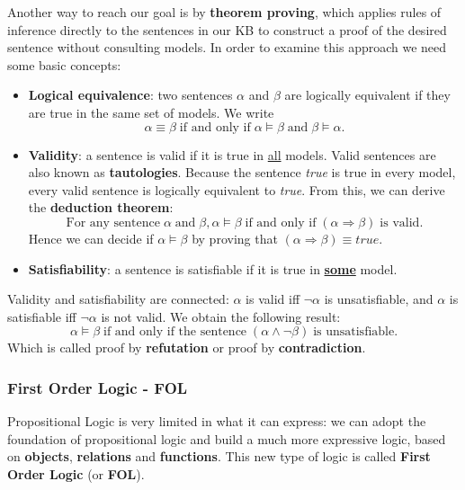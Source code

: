 \documentclass{article}
\begin{document}
Another way to reach our goal is by \textbf{theorem proving}, which applies rules of inference directly to the sentences in our KB to construct a proof of the desired sentence without consulting models. In order to examine this approach we need some basic concepts:
\begin{itemize}
    \item \textbf{Logical equivalence}: two sentences $\alpha$ and $\beta$ are logically equivalent if they are true in the same set of models. We write 
        $$\alpha\equiv\beta \;\text{if and only if}\; \alpha\models\beta \;\text{and}\; \beta\models\alpha.$$
    
    \item \textbf{Validity}: a sentence is valid if it is true in \underline{all} models. Valid sentences are also known as \textbf{tautologies}. Because the sentence \textit{true} is true in every model, every valid sentence is logically equivalent to \textit{true}. From this, we can derive the \textbf{deduction theorem}:
        $$\text{For any sentence}\; \alpha \;\text{and}\; \beta, \alpha\models\beta \;\text{if and only if}\; (\alpha\Rightarrow\beta) \;\text{is valid}.$$
    Hence we can decide if $\alpha\models\beta$ by proving that $(\alpha\Rightarrow\beta)\equiv true$.
    
    \item \textbf{Satisfiability}: a sentence is satisfiable if it is true in \underline{\textbf{some}} model.
\end{itemize}

\noindent Validity and satisfiability are connected: $\alpha$ is valid iff $\neg\alpha$ is unsatisfiable, and $\alpha$ is satisfiable iff $\neg\alpha$ is not valid. We obtain the following result:
    $$\alpha\models\beta \;\text{if and only if the sentence}\; (\alpha\land\neg\beta) \;\text{is unsatisfiable}.$$
Which is called proof by \textbf{refutation} or proof by \textbf{contradiction}.

\subsubsection{First Order Logic - FOL}
Propositional Logic is very limited in what it can express: we can adopt the foundation of propositional logic and build a much more expressive logic, based on \textbf{objects}, \textbf{relations} and \textbf{functions}. This new type of logic is called \textbf{First Order Logic} (or \textbf{FOL}).
\end{document}
